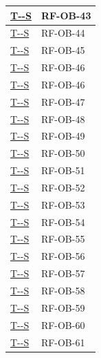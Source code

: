 \documentclass[a4paper,12pt]{article}
\newcounter{testsys}
\newcommand{\systestref}{%
  \hyperlink{T-\arabic{testsys}-S}{T-\arabic{testsys}-S}%
}
\begin{document}
\begin{center}
\begin{longtable}{|>{\centering\arraybackslash}p{5cm}|>{\centering\arraybackslash}p{9cm}|}
\stepcounter{testsys}
\systestref & RF-OB-43 \\
\hline

\stepcounter{testsys}
\systestref & RF-OB-44 \\
\hline

\stepcounter{testsys}
\systestref & RF-OB-45 \\
\hline

\stepcounter{testsys}
\systestref & RF-OB-46 \\
\hline

\stepcounter{testsys}
\systestref & RF-OB-46 \\
\hline

\stepcounter{testsys}
\systestref & RF-OB-47 \\
\hline

\stepcounter{testsys}
\systestref & RF-OB-48 \\
\hline

\stepcounter{testsys}
\systestref & RF-OB-49 \\
\hline

\stepcounter{testsys}
\systestref & RF-OB-50 \\
\hline

\stepcounter{testsys}
\systestref & RF-OB-51 \\
\hline

\stepcounter{testsys}
\systestref & RF-OB-52 \\
\hline

\stepcounter{testsys}
\systestref & RF-OB-53 \\
\hline

\stepcounter{testsys}
\systestref & RF-OB-54 \\
\hline

\stepcounter{testsys}
\systestref & RF-OB-55 \\
\hline

\stepcounter{testsys}
\systestref & RF-OB-56 \\
\hline

\stepcounter{testsys}
\systestref & RF-OB-57 \\
\hline

\stepcounter{testsys}
\systestref & RF-OB-58 \\
\hline

\stepcounter{testsys}
\systestref & RF-OB-59 \\
\hline

\stepcounter{testsys}
\systestref & RF-OB-60 \\
\hline

\stepcounter{testsys}
\systestref & RF-OB-61 \\
\hline


\end{longtable}
\end{center}
\end{document}
